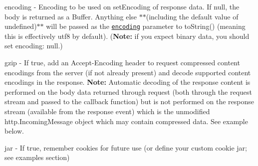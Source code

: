 \begin{DoxyItemize}
\item {\ttfamily encoding} -\/ Encoding to be used on {\ttfamily set\+Encoding} of response data. If {\ttfamily null}, the {\ttfamily body} is returned as a {\ttfamily Buffer}. Anything else $\ast$$\ast$(including the default value of {\ttfamily undefined})$\ast$$\ast$ will be passed as the \href{http://nodejs.org/api/buffer.html#buffer_buffer}{\tt encoding} parameter to {\ttfamily to\+String()} (meaning this is effectively {\ttfamily utf8} by default). ({\bfseries Note\+:} if you expect binary data, you should set {\ttfamily encoding\+: null}.)
\item {\ttfamily gzip} -\/ If {\ttfamily true}, add an {\ttfamily Accept-\/\+Encoding} header to request compressed content encodings from the server (if not already present) and decode supported content encodings in the response. {\bfseries Note\+:} Automatic decoding of the response content is performed on the body data returned through {\ttfamily request} (both through the {\ttfamily request} stream and passed to the callback function) but is not performed on the {\ttfamily response} stream (available from the {\ttfamily response} event) which is the unmodified {\ttfamily http.\+Incoming\+Message} object which may contain compressed data. See example below.
\item {\ttfamily jar} -\/ If {\ttfamily true}, remember cookies for future use (or define your custom cookie jar; see examples section) 



\end{DoxyItemize}

